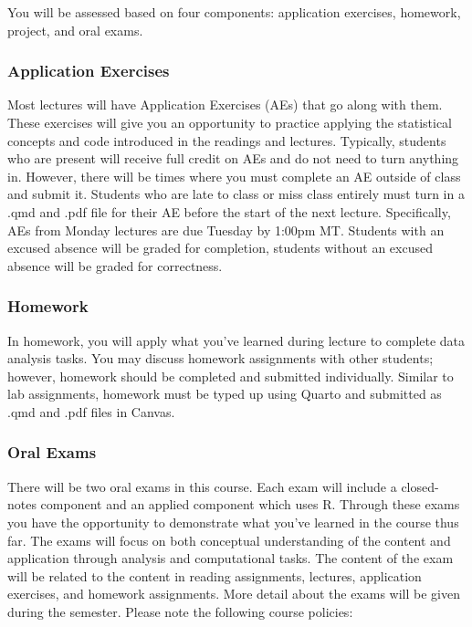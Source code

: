 \documentclass[
  letterpaper,
  DIV=11,
  numbers=noendperiod]{scrartcl}
\begin{document}
You will be assessed based on four components: application exercises,
homework, project, and oral exams.

\subsubsection{Application Exercises}\label{application-exercises}

Most lectures will have Application Exercises (AEs) that go along with
them. These exercises will give you an opportunity to practice applying
the statistical concepts and code introduced in the readings and
lectures. Typically, students who are present will receive full credit
on AEs and do not need to turn anything in. However, there will be times
where you must complete an AE outside of class and submit it. Students
who are late to class or miss class entirely must turn in a .qmd and
.pdf file for their AE before the start of the next lecture.
Specifically, AEs from Monday lectures are due Tuesday by 1:00pm MT.
Students with an excused absence will be graded for completion, students
without an excused absence will be graded for correctness.

\subsubsection{Homework}\label{homework}

In homework, you will apply what you've learned during lecture to
complete data analysis tasks. You may discuss homework assignments with
other students; however, homework should be completed and submitted
individually. Similar to lab assignments, homework must be typed up
using Quarto and submitted as .qmd and .pdf files in Canvas.

\subsubsection{Oral Exams}\label{oral-exams}

There will be two oral exams in this course. Each exam will include a
closed-notes component and an applied component which uses R. Through
these exams you have the opportunity to demonstrate what you've learned
in the course thus far. The exams will focus on both conceptual
understanding of the content and application through analysis and
computational tasks. The content of the exam will be related to the
content in reading assignments, lectures, application exercises, and
homework assignments. More detail about the exams will be given during
the semester. Please note the following course policies:
\end{document}
